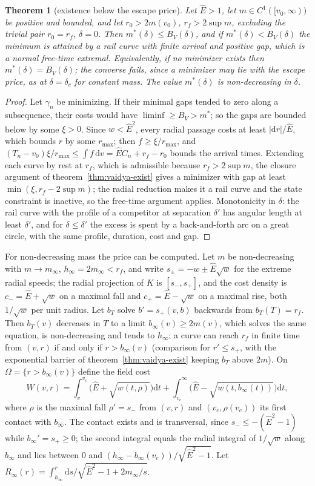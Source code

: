 \documentclass[aip,jmp,amsmath,amssymb,reprint]{revtex4-2}
\newcommand{\Ehat}{\hat E}
\newcommand{\dd}{\mathrm{d}}
\theoremstyle{plain}
\newtheorem{theorem}{Theorem}
\theoremstyle{definition}
\begin{document}
\begin{theorem}[existence below the escape price]\label{thm:vaidya-exist-inf}
Let $\Ehat>1$, let $m\in C^1([v_0,\infty))$ be positive and bounded, and let $r_0>2m(v_0)$,
$r_f>2\sup m$, excluding the trivial pair $r_0=r_f$, $\delta=0$. Then $m^*(\delta)\le B_V(\delta)$, and if
$m^*(\delta)<B_V(\delta)$ the minimum is attained by a rail curve with finite arrival and positive
gap, which is a normal free-time extremal. Equivalently, if no minimizer exists then
$m^*(\delta)=B_V(\delta)$; the converse fails, since a minimizer may tie with the escape price, as
at $\delta=\delta_c$ for constant mass. The value $m^*(\delta)$ is non-decreasing in $\delta$.
\end{theorem}

\begin{proof}
Let $\gamma_n$ be minimizing. If their minimal gaps tended to zero along a subsequence, their
costs would have $\liminf\ge B_V>m^*$; so the gaps are bounded below by some $\xi>0$. Since
$w<\Ehat^2$, every radial passage costs at least $|\dd r|/\Ehat$, which bounds $r$ by some $r_{\max}$;
then $f\ge\xi/r_{\max}$, and $(T_n-v_0)\xi/r_{\max}\le\int f\,\dd v=\Ehat C_n+r_f-r_0$ bounds the
arrival times. Extending each curve by rest at $r_f$, which is admissible because
$r_f>2\sup m$, the closure argument of theorem~\ref{thm:vaidya-exist} gives a minimizer with gap at
least $\min(\xi,r_f-2\sup m)$; the radial reduction makes it a rail curve and the state
constraint is inactive, so the free-time argument applies. Monotonicity in $\delta$: the
rail curve with the profile of a competitor at separation $\delta'$ has angular length at least
$\delta'$, and for $\delta\le\delta'$ the excess is spent by a back-and-forth arc on a great circle,
with the same profile, duration, cost and gap.
\end{proof}

For non-decreasing mass the price can be computed. Let $m$ be non-decreasing with
$m\to m_\infty$, $h_\infty=2m_\infty<r_f$, and write $s_\pm=-w\pm\Ehat\sqrt w$ for the extreme radial
speeds; the radial projection of $K$ is $[s_-,s_+]$, and the cost density is
$c_-=\Ehat+\sqrt w$ on a maximal fall and $c_+=\Ehat-\sqrt w$ on a maximal rise, both $1/\sqrt w$ per unit
radius. Let $b_T$ solve $b'=s_+(v,b)$ backwards from $b_T(T)=r_f$. Then $b_T(v)$ decreases in $T$ to
a limit $b_\infty(v)\ge2m(v)$, which solves the same equation, is non-decreasing and tends to
$h_\infty$; a curve can reach $r_f$ in finite time from $(v,r)$ if and only if $r>b_\infty(v)$
(comparison for $r'\le s_+$, with the exponential barrier of theorem~\ref{thm:vaidya-exist} keeping
$b_T$ above $2m$). On $\Omega=\{r>b_\infty(v)\}$ define the field cost
\[
  W(v,r)=\int_v^{v_c}\big(\Ehat+\sqrt{w(t,\rho)}\big)\dd t+\int_{v_c}^\infty\big(\Ehat-\sqrt{w(t,b_\infty(t))}\big)\dd t,
\]
where $\rho$ is the maximal fall $\rho'=s_-$ from $(v,r)$ and $(v_c,\rho(v_c))$ its first contact with
$b_\infty$. The contact exists and is transversal, since $s_-\le-(\Ehat^2-1)$ while $b_\infty'=s_+\ge0$;
the second integral equals the radial integral of $1/\sqrt w$ along $b_\infty$ and lies between
$0$ and $(h_\infty-b_\infty(v_c))/\sqrt{\Ehat^2-1}$. Let $R_\infty(r)=\int_{h_\infty}^r\dd s/\sqrt{\Ehat^2-1+2m_\infty/s}$.
\end{document}
